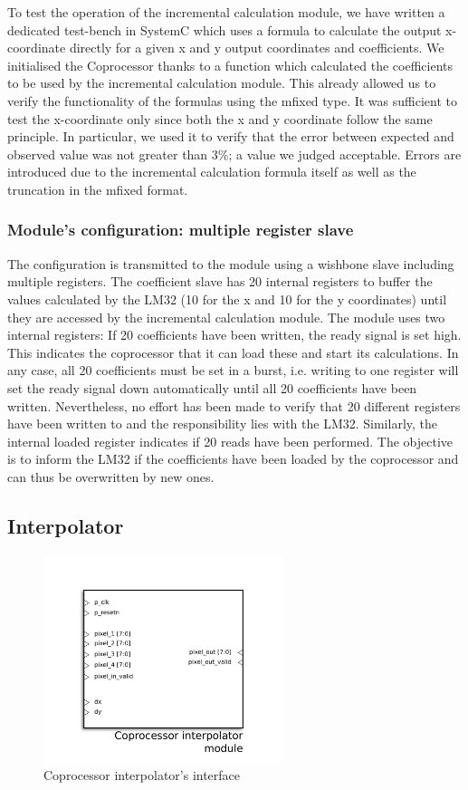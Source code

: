 To test the operation of the incremental calculation module, we have written a dedicated test-bench in SystemC which uses a formula to calculate the output x-coordinate directly for a given x and y output coordinates and coefficients. We initialised the Coprocessor thanks to a function which calculated the coefficients to be used by the incremental calculation module. This already allowed us to verify the functionality of the formulas using the mfixed type. It was sufficient to test the x-coordinate only since both the x and y coordinate follow the same principle. In particular, we used it to verify that the error between expected and observed value was not greater than 3\%; a value we judged acceptable. Errors are introduced due to the incremental calculation formula itself as well as the truncation in the mfixed format.

\subsubsection{Module's configuration: multiple register slave}



The configuration is transmitted to the module using a wishbone slave including multiple registers.
The coefficient slave has 20 internal registers to buffer the values calculated by the LM32 (10 for the x and 10 for the y coordinates) until they are accessed by the incremental calculation module. The module uses two internal registers: If 20 coefficients have been written, the ready signal is set high. This indicates the coprocessor that it can load these and start its calculations. In any case, all 20 coefficients must be set in a burst, i.e. writing to one register will set the ready signal down automatically until all 20 coefficients have been written. Nevertheless, no effort has been made to verify that 20 different registers have been written to and the responsibility lies with the LM32. Similarly, the internal loaded register indicates if 20 reads have been performed. The objective is to inform the LM32 if the coefficients have been loaded by the coprocessor and can thus be overwritten by new ones.

\subsection{Interpolator}

\begin{figure}[H]
\center
\includegraphics[width=7cm]{figs/INTERPOLATOR.pdf}
\caption{Coprocessor interpolator's interface}
\label{interpo_ports}
\end{figure}



